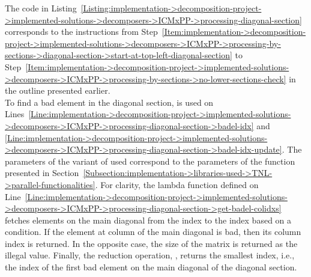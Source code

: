 The code in Listing~\ref{Listing:implementation->decomposition-project->implemented-solutions->decomposers->ICMxPP->processing-diagonal-section} corresponds to the instructions from Step~\ref{Item:implementation->decomposition-project->implemented-solutions->decomposers->ICMxPP->processing-by-sections->diagonal-section->start-at-top-left-diagonal-section} to Step~\ref{Item:implementation->decomposition-project->implemented-solutions->decomposers->ICMxPP->processing-by-sections->no-lower-sections-check} in the outline presented earlier.\\
To find a bad element in the diagonal section,  is used on Lines~\ref{Line:implementation->decomposition-project->implemented-solutions->decomposers->ICMxPP->processing-diagonal-section->badel-idx} and \ref{Line:implementation->decomposition-project->implemented-solutions->decomposers->ICMxPP->processing-diagonal-section->badel-idx-update}. The parameters of the variant of  used correspond to the parameters of the  function presented in Section~\ref{Subsection:implementation->libraries-used->TNL->parallel-functionalities}. For clarity, the lambda function defined on Line~\ref{Line:implementation->decomposition-project->implemented-solutions->decomposers->ICMxPP->processing-diagonal-section->get-badel-colidxs} fetches elements on the main diagonal from the  index to the  index based on a condition. If the element at column  of the main diagonal is bad, then its column index is returned. In the opposite case, the size of the matrix is returned as the illegal value. Finally, the reduction operation, , returns the smallest index, i.e., the index of the first bad element on the main diagonal of the diagonal section.

